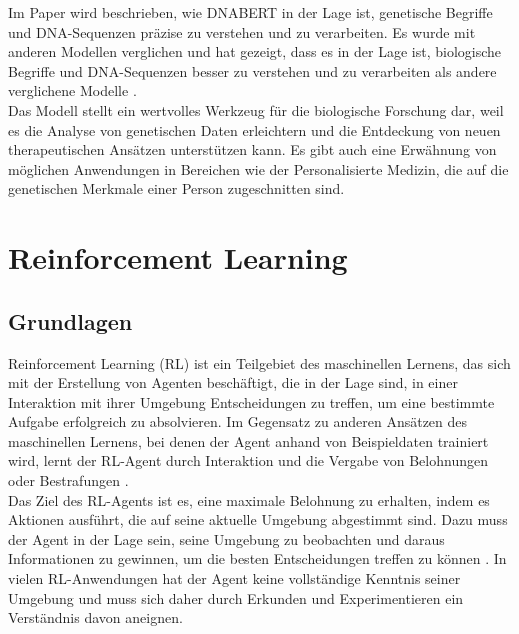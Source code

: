 \documentclass[oneside,bibliography=totocnumbered,BCOR=5mm]{scrbook}%
\theoremstyle{definition}
\theoremstyle{definition}
\theoremstyle{definition}
\theoremstyle{definition}
\theoremstyle{definition}
\theoremstyle{definition}
\begin{document}
Im Paper wird beschrieben, wie DNABERT in der Lage ist, 
genetische Begriffe und DNA-Sequenzen präzise zu verstehen und zu verarbeiten. 
Es wurde mit anderen Modellen verglichen und hat gezeigt, dass es in der Lage ist, 
biologische Begriffe und DNA-Sequenzen besser zu verstehen und zu verarbeiten als andere 
verglichene Modelle \autocite[Seite 2118]{dnabert}. \\


Das Modell stellt ein wertvolles Werkzeug für die biologische Forschung dar, 
weil es die Analyse von genetischen Daten erleichtern und die Entdeckung von neuen therapeutischen Ansätzen unterstützen kann. 
Es gibt auch eine Erwähnung von möglichen Anwendungen in Bereichen wie der Personalisierte Medizin, 
die auf die genetischen Merkmale einer Person zugeschnitten sind. \\
\linebreak[4]

\clearpage

\section{Reinforcement Learning}

\subsection{Grundlagen}
Reinforcement Learning (RL) ist ein Teilgebiet des maschinellen Lernens, 
das sich mit der Erstellung von Agenten beschäftigt, die in der Lage sind, 
in einer Interaktion mit ihrer Umgebung Entscheidungen zu treffen, um eine bestimmte Aufgabe erfolgreich zu absolvieren. 
Im Gegensatz zu anderen Ansätzen des maschinellen Lernens, bei denen der Agent anhand von Beispieldaten trainiert wird, 
lernt der RL-Agent durch Interaktion und die Vergabe von Belohnungen oder Bestrafungen \autocite[Seite 2]{deepRL}. \\


Das Ziel des RL-Agents ist es, eine maximale Belohnung zu erhalten, indem es Aktionen ausführt, 
die auf seine aktuelle Umgebung abgestimmt sind. 
Dazu muss der Agent in der Lage sein, seine Umgebung zu beobachten und daraus Informationen zu gewinnen, 
um die besten Entscheidungen treffen zu können \autocite[Seite 2]{deepRL}. 
In vielen RL-Anwendungen hat der Agent keine vollständige Kenntnis seiner Umgebung und muss sich daher 
durch Erkunden und Experimentieren ein Verständnis davon aneignen. \\
\end{document}
